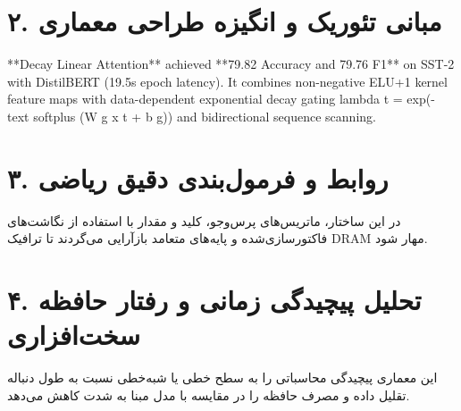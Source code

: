 \documentclass[12pt,a4paper]{article}
\begin{document}
\section*{۲. مبانی تئوریک و انگیزه طراحی معماری}
**Decay Linear Attention** achieved **79.82 Accuracy and 79.76 F1** on SST-2 with DistilBERT (19.5s epoch latency). It combines non-negative ELU+1 kernel feature maps with data-dependent exponential decay gating lambda t = exp(- text softplus (W g x t + b g)) and bidirectional sequence scanning.

\section*{۳. روابط و فرمول‌بندی دقیق ریاضی}
در این ساختار، ماتریس‌های پرس‌وجو، کلید و مقدار با استفاده از نگاشت‌های فاکتورسازی‌شده و پایه‌های متعامد بازآرایی می‌گردند تا ترافیک DRAM مهار شود.

\section*{۴. تحلیل پیچیدگی زمانی و رفتار حافظه سخت‌افزاری}
این معماری پیچیدگی محاسباتی را به سطح خطی یا شبه‌خطی نسبت به طول دنباله تقلیل داده و مصرف حافظه را در مقایسه با مدل مبنا به شدت کاهش می‌دهد.
\end{document}

